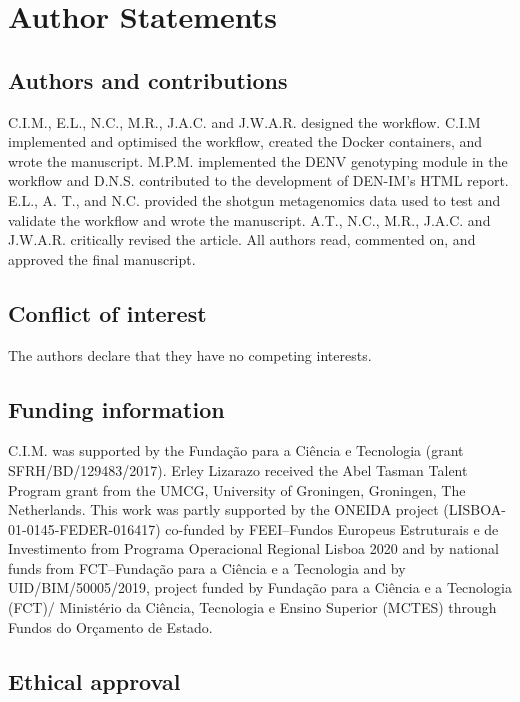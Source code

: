 \section{Author Statements}

\subsection{Authors and contributions}

C.I.M., E.L., N.C., M.R., J.A.C. and J.W.A.R. designed the workflow. C.I.M implemented and optimised the workflow, created the Docker containers, and wrote the manuscript. M.P.M. implemented the DENV genotyping module in the workflow and D.N.S. contributed to the development of DEN-IM’s HTML report. E.L., A. T., and N.C. provided the shotgun metagenomics data used to test and validate the workflow and wrote the manuscript. A.T., N.C., M.R., J.A.C. and J.W.A.R. critically revised the article. All authors read, commented on, and approved the final manuscript.

\subsection{Conflict of interest}

The authors declare that they have no competing interests.

\subsection{Funding information}

C.I.M. was supported by the Fundação para a Ciência e Tecnologia (grant SFRH/BD/129483/2017). Erley Lizarazo received the Abel Tasman Talent Program grant from the UMCG, University of Groningen, Groningen, The Netherlands. This work was partly supported by the ONEIDA project (LISBOA-01-0145-FEDER-016417) co-funded by FEEI–Fundos Europeus Estruturais e de Investimento from Programa Operacional Regional Lisboa 2020 and by national funds from FCT–Fundação para a Ciência e a Tecnologia and by UID/BIM/50005/2019, project funded by Fundação para a Ciência e a Tecnologia (FCT)/ Ministério da Ciência, Tecnologia e Ensino Superior (MCTES) through Fundos do Orçamento de Estado.

\subsection{Ethical approval}

